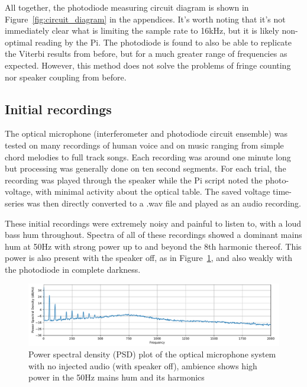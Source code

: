 \documentclass[prb,preprint]{revtex4-1}
\begin{document}
All together, the photodiode measuring circuit diagram is shown in Figure~\ref{fig:circuit_diagram} in the appendices. It’s worth noting that it’s not immediately clear what is limiting the sample rate to 16kHz, but it is likely non-optimal reading by the Pi.
The photodiode is found to also be able to replicate the Viterbi results from before, but for a much greater range of frequencies as expected. However, this method does not solve the problems of fringe counting nor speaker coupling from before.


\subsection{Initial recordings}

The optical microphone (interferometer and photodiode circuit ensemble) was tested on many recordings of human voice and on music ranging from simple chord melodies to full track songs. Each recording was around one minute long but processing was generally done on ten second segments. For each trial, the recording was played through the speaker while the Pi script noted the photo-voltage, with minimal activity about the optical table. The saved  voltage time-series was then directly converted to a .wav file and played as an audio recording.


These initial recordings were extremely noisy and painful to listen to, with a loud bass hum throughout. Spectra of all of these recordings showed a dominant mains hum at 50Hz with strong power up to and beyond the 8th harmonic thereof. This power is also present with the speaker off, as in Figure~\ref{fig:psd_noise}, and also weakly with the photodiode in complete darkness.

\begin{figure}%
	\includegraphics[width=\textwidth]{podo_noise_psd_zoom-cropped.pdf}
	\caption{Power spectral density (PSD) plot of the optical microphone system with no injected audio (with speaker off), ambience shows high power in the 50Hz mains hum and its harmonics}
	\label{fig:psd_noise}
\end{figure}
\end{document}

